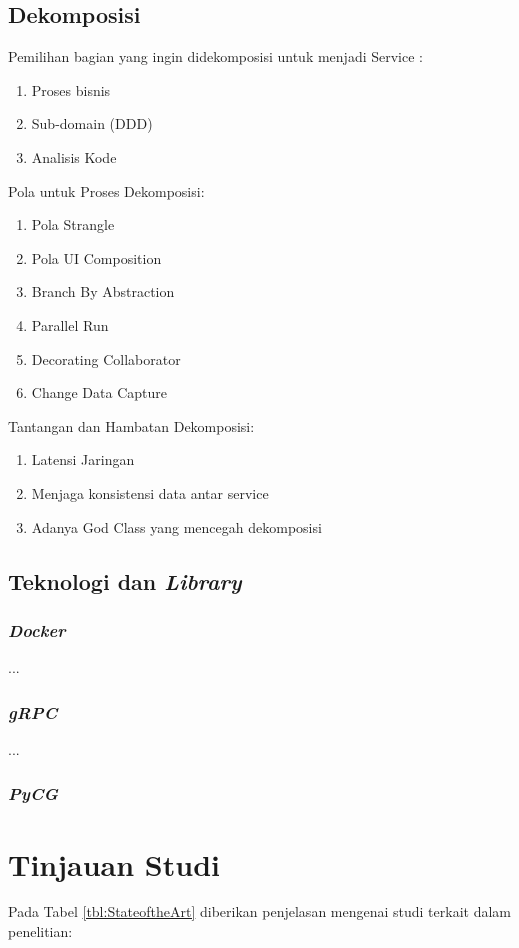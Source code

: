 \subsection{Dekomposisi}
Pemilihan bagian yang ingin didekomposisi untuk menjadi Service \cite{6}:
\begin{enumerate}[leftmargin=1.3cm]
	\item Proses bisnis
	\item Sub-domain (DDD)
	\item Analisis Kode
\end{enumerate}	

Pola untuk Proses Dekomposisi:
\begin{enumerate}[leftmargin=1.3cm]
	\item Pola Strangle 
	\item Pola UI Composition
	\item Branch By Abstraction
	\item Parallel Run
	\item Decorating Collaborator
	\item Change Data Capture
\end{enumerate}	

Tantangan dan Hambatan Dekomposisi:
\begin{enumerate}[leftmargin=1.3cm]
	\item Latensi Jaringan
	\item Menjaga konsistensi data antar service
	\item Adanya God Class yang mencegah dekomposisi
\end{enumerate}	

\subsection{Teknologi dan \textit{Library}}
\subsubsection{\textit{Docker}}
...
\subsubsection{\textit{gRPC}}
...
\subsubsection{\textit{PyCG}}

\section{Tinjauan Studi}
\par Pada Tabel \ref{tbl:StateoftheArt} diberikan penjelasan mengenai studi terkait dalam penelitian:

